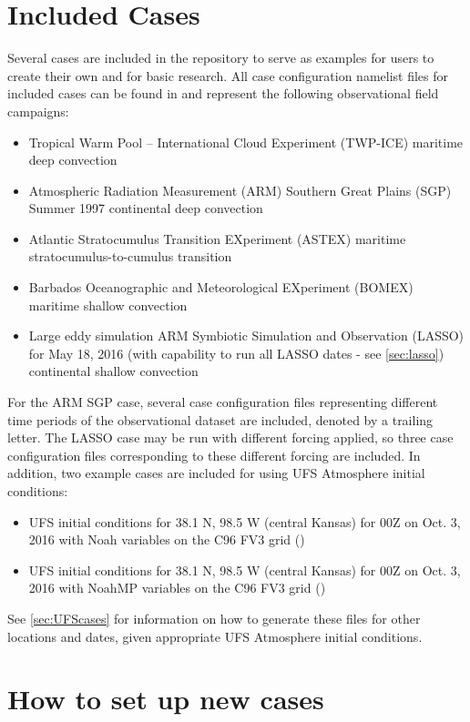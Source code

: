 \section{Included Cases}
Several cases are included in the repository to serve as examples for users to create their own and for basic research. All case configuration namelist files for included cases can be found in  and represent the following observational field campaigns:
\begin{itemize}
\item Tropical Warm Pool -- International Cloud Experiment (TWP-ICE) maritime deep convection
\item Atmospheric Radiation Measurement (ARM) Southern Great Plains (SGP) Summer 1997 continental deep convection
\item Atlantic Stratocumulus Transition EXperiment (ASTEX) maritime stratocumulus-to-cumulus transition
\item Barbados Oceanographic and Meteorological EXperiment (BOMEX) maritime shallow convection
\item Large eddy simulation ARM Symbiotic Simulation and Observation (LASSO) for May 18, 2016 (with capability to run all LASSO dates - see \ref{sec:lasso}) continental shallow convection
\end{itemize}
For the ARM SGP case, several case configuration files representing different time periods of the observational dataset are included, denoted by a trailing letter. The LASSO case may be run with different forcing applied, so three case configuration files corresponding to these different forcing are included. In addition, two example cases are included for using UFS Atmosphere initial conditions:
\begin{itemize}
\item UFS initial conditions for 38.1 N, 98.5 W (central Kansas) for 00Z on Oct. 3, 2016 with Noah variables on the C96 FV3 grid ()
\item UFS initial conditions for 38.1 N, 98.5 W (central Kansas) for 00Z on Oct. 3, 2016 with NoahMP variables on the C96 FV3 grid ()
\end{itemize}
See \ref{sec:UFScases} for information on how to generate these files for other locations and dates, given appropriate UFS Atmosphere initial conditions.

\section{How to set up new cases}

